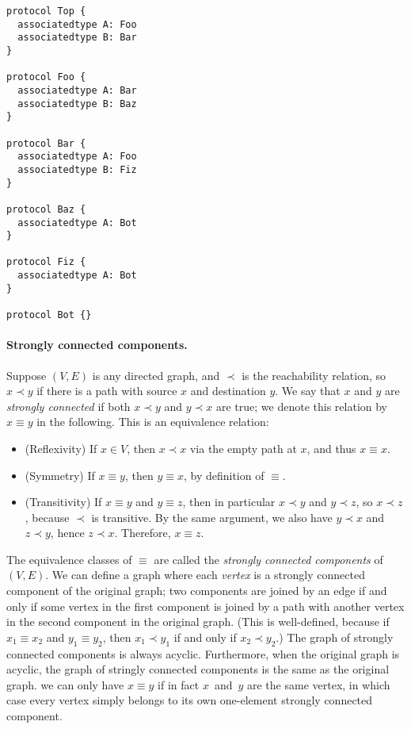 \documentclass[../generics]{subfiles}
\begin{document}
\begin{listing}\label{protocol component listing}
\begin{Verbatim}
protocol Top {
  associatedtype A: Foo
  associatedtype B: Bar
}

protocol Foo {
  associatedtype A: Bar
  associatedtype B: Baz
}

protocol Bar {
  associatedtype A: Foo
  associatedtype B: Fiz
}

protocol Baz {
  associatedtype A: Bot
}

protocol Fiz {
  associatedtype A: Bot
}

protocol Bot {}
\end{Verbatim}
\end{listing}

\paragraph{Strongly connected components.}
Suppose $(V, E)$ is any directed graph, and $\prec$ is the reachability relation, so $x\prec y$ if there is a path with source $x$ and destination $y$. We say that $x$ and $y$ are \emph{strongly connected} if both $x\prec y$ and $y\prec x$ are true; we denote this relation by $x\equiv y$ in the following. This is an equivalence relation:
\begin{itemize}
\item {}(Reflexivity) If $x\in V$, then $x\prec x$ via the empty path at $x$, and thus $x\equiv x$.
\item {}(Symmetry) If $x\equiv y$, then $y\equiv x$, by definition of $\equiv$.
\item {}(Transitivity) If $x\equiv y$ and $y\equiv z$, then in particular $x\prec y$ and $y\prec z$, so $x\prec z$, because $\prec$ is transitive. By the same argument, we also have $y\prec x$ and $z\prec y$, hence $z\prec x$. Therefore, $x\equiv z$.
\end{itemize}

The equivalence classes of $\equiv$ are called the \emph{strongly connected components} of $(V, E)$. We can define a graph where each \emph{vertex} is a strongly connected component of the original graph; two components are joined by an edge if and only if some vertex in the first component is joined by a path with another vertex in the second component in the original graph. (This is well-defined, because if $x_1\equiv x_2$ and $y_1\equiv y_2$, then $x_1\prec y_1$ if and only if $x_2\prec y_2$.) The graph of strongly connected components is always acyclic. Furthermore, when the original graph is acyclic, the graph of stringly connected components is the same as the original graph. we can only have $x\equiv y$ if in fact $x$~and~$y$ are the same vertex, in which case every vertex simply belongs to its own one-element strongly connected component.
\end{document}
